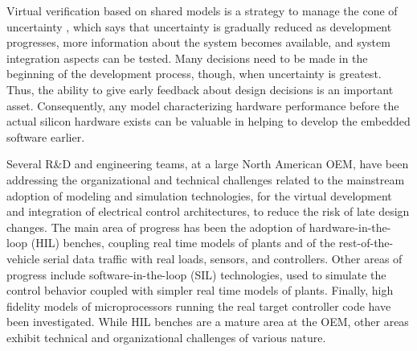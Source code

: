 Virtual verification based on shared models is a strategy to manage the cone of uncertainty \cite{Boehm1981}, 
which says that uncertainty is gradually reduced as development progresses,
more information about the system becomes available,
and system integration aspects can be tested.
Many decisions need to be made in the beginning of the development process, though, when uncertainty is greatest.
Thus, the ability to give early feedback about design decisions is an important asset.
Consequently, any model characterizing hardware performance before the actual silicon hardware exists can be valuable in helping to develop the embedded software earlier.

Several R\&D and engineering teams,
at a large North American OEM,
have been addressing the organizational and technical challenges related to the mainstream adoption of modeling and simulation technologies, for the virtual development and integration of electrical control architectures, to reduce the risk of late design changes.
The main area of progress has been the adoption of hardware-in-the-loop (HIL) benches,
coupling real time models of plants and of the rest-of-the-vehicle serial data traffic with real loads, sensors, and controllers.
Other areas of progress include software-in-the-loop (SIL) technologies, used to simulate the control behavior coupled with simpler real time models of plants.
Finally, high fidelity models of microprocessors running the real target controller code have been investigated.
While HIL benches are a mature area at the OEM, other areas exhibit technical and organizational challenges of various nature.

